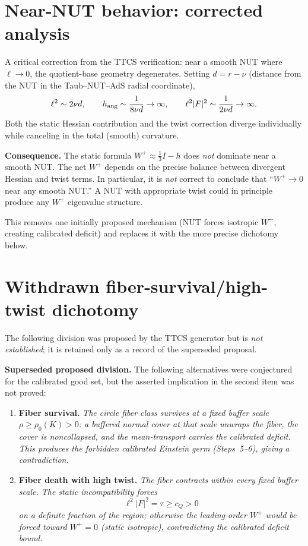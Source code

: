 \section{Near-NUT behavior: corrected analysis}

A critical correction from the TTCS verification: near a smooth NUT
where $\ell\to0$, the quotient-base geometry degenerates.  Setting
$d=r-\nu$ (distance from the NUT in the Taub--NUT--AdS radial coordinate),
\[
 \ell^2\sim2\nu d,\qquad
 h_{\rm ang}\sim\frac{1}{8\nu d}\to\infty,\qquad
 \ell^2|F|^2\sim\frac{1}{2\nu d}\to\infty.
\]
Both the static Hessian contribution and the twist correction diverge
individually while canceling in the total (smooth) curvature.

\medskip
\noindent\textbf{Consequence.}
The static formula $W^+\approx\frac13I-h$ does \emph{not} dominate near
a smooth NUT.  The net $W^+$ depends on the precise balance between
divergent Hessian and twist terms.  In particular, it is \emph{not}
correct to conclude that ``$W^+\to0$ near any smooth NUT.''  A
NUT with appropriate twist could in principle produce any $W^+$
eigenvalue structure.

This removes one initially proposed mechanism (NUT forces isotropic $W^+$,
creating calibrated deficit) and replaces it with the more precise dichotomy
below.

\section{Withdrawn fiber-survival/high-twist dichotomy}

The following division was proposed by the TTCS generator but is \emph{not
established}; it is retained only as a record of the superseded proposal.

\medskip
\noindent\textbf{Superseded proposed division.}
The following alternatives were conjectured for the calibrated good set, but
the asserted implication in the second item was not proved:

\begin{enumerate}
\item[\textbf{(S)}] \textbf{Fiber survival.}
\emph{The circle fiber class survives at a fixed buffer scale
$\rho\ge\rho_0(K)>0$: a buffered normal cover at that scale unwraps
the fiber, the cover is noncollapsed, and the mean-transport carries
the calibrated deficit.  This produces the forbidden calibrated Einstein
germ (Steps~5--6), giving a contradiction.}

\item[\textbf{(D)}] \textbf{Fiber death with high twist.}
\emph{The fiber contracts within every fixed buffer scale.  The static
incompatibility forces}
\[
 \ell^2|F|^2=\tau\ge c_Q>0
\]
\emph{on a definite fraction of the region; otherwise the leading-order
$W^+$ would be forced toward $W^+=0$ (static isotropic), contradicting
the calibrated deficit bound.}
\end{enumerate}


